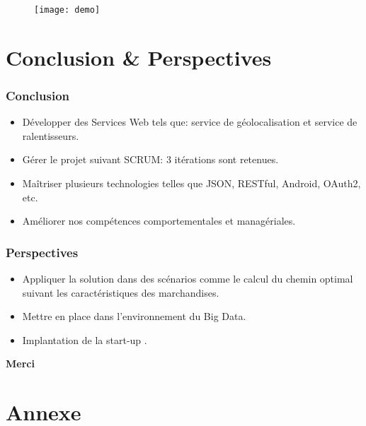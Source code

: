 \documentclass{beamer}
\begin{document}
\begin{frame}
    \begin{center}
    \begin{figure}
        \texttt{[image: demo]}
    \end{figure}
    \end{center}
\end{frame}

\section{Conclusion \& Perspectives}

\begin{frame}
    \frametitle{Conclusion}
    \begin{itemize}
        \item Développer des Services Web tels que: service de géolocalisation et service de ralentisseurs.
        \item Gérer le projet suivant SCRUM: 3 itérations sont retenues.
        \item Maîtriser plusieurs technologies telles que JSON, RESTful, Android, OAuth2, etc.
        \item Améliorer nos compétences comportementales et managériales.
    \end{itemize}
\end{frame}

\begin{frame}
    \frametitle{Perspectives}
    \begin{itemize}
        \item Appliquer la solution dans des scénarios comme le calcul du chemin optimal suivant les caractéristiques des marchandises.
        \item Mettre en place dans l'environnement du Big Data.
        \item Implantation de la start-up .
    \end{itemize}
\end{frame}

\begin{frame}
    \begin{center}
        \bfseries \Huge
        Merci
    \end{center}
\end{frame}

\section*{Annexe}
\end{document}
